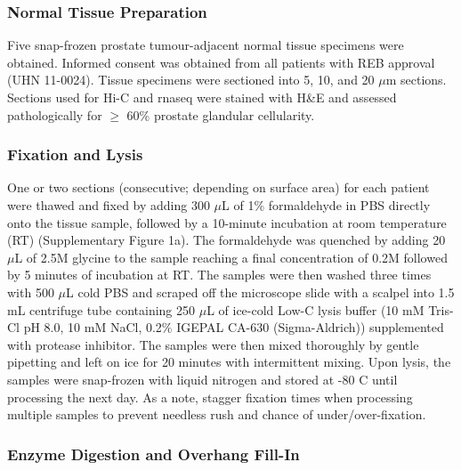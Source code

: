 \subsubsection{Normal Tissue Preparation}

Five snap-frozen prostate tumour-adjacent normal tissue specimens were obtained.
Informed consent was obtained from all patients with REB approval (UHN 11-0024).
Tissue specimens were sectioned into 5, 10, and 20 $\mu$m sections.
Sections used for Hi-C and \gls{rnaseq} were stained with H\&E and assessed pathologically for $\ge$ 60\% prostate glandular cellularity.

\subsubsection{Fixation and Lysis}

One or two sections (consecutive; depending on surface area) for each patient were thawed and fixed by adding 300 $\mu$L of 1\% formaldehyde in PBS directly onto the tissue sample, followed by a 10-minute incubation at room temperature (RT) (Supplementary Figure 1a).
The formaldehyde was quenched by adding 20 $\mu$L of 2.5M glycine to the sample reaching a final concentration of 0.2M followed by 5 minutes of incubation at RT.
The samples were then washed three times with 500 $\mu$L cold PBS and scraped off the microscope slide with a scalpel into 1.5 mL centrifuge tube containing 250 $\mu$L of ice-cold Low-C lysis buffer (10 mM Tris-Cl pH 8.0, 10 mM NaCl, 0.2\% IGEPAL CA-630 (Sigma-Aldrich)) supplemented with protease inhibitor.
The samples were then mixed thoroughly by gentle pipetting and left on ice for 20 minutes with intermittent mixing.
Upon lysis, the samples were snap-frozen with liquid nitrogen and stored at -80 \textdegree C until processing the next day.
As a note, stagger fixation times when processing multiple samples to prevent needless rush and chance of under/over-fixation.

\subsubsection{Enzyme Digestion and Overhang Fill-In}

